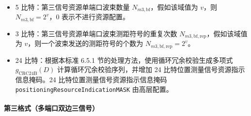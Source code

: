 \documentclass[11pt,a4paper]{ctexart}
\begin{document}
\begin{itemize}[nosep]
  \item 5 比特：第三信号资源单端口波束数量 $N_{m3,\mathrm{bf}}$，假如该域值为 $v$，则 $N_{m3,\mathrm{bf}} = 2^v$，0 表示不进行资源配置。
  \item 3 比特：第三信号资源单端口波束测距符号的重复次数 $N_{m3,\mathrm{bf,rep}}$，假如该域值为 $v$，则一个波束发送的测距符号的个数为 $N_{m3,\mathrm{bf,rep}} = 2^v$。
  \item 24 比特：根据本标准 6.5.1 节的处理方法，使用循环冗余校验生成多项式 $g_{\mathrm{CRC24B}}(D)$ 计算循环冗余校验序列，并增加 24 比特位置测量信号资源指示信息掩码。24 比特位置测量信号资源指示信息掩码 \texttt{positioningResourceIndicationMASK} 由高层配置。
\end{itemize}

\paragraph{第三格式（多端口双边三信号）}
\end{document}
